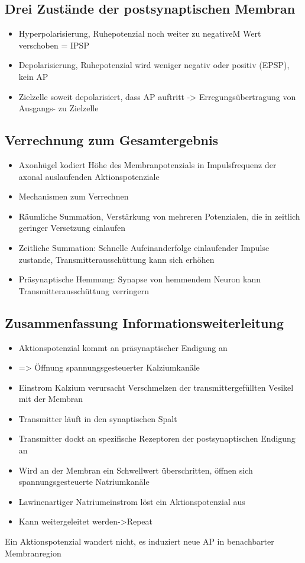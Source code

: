 \documentclass[a4paper,10pt,oneside]{article}
\begin{document}
\subsection{Drei Zustände der postsynaptischen Membran}
\begin{itemize}
	\item Hyperpolarisierung, Ruhepotenzial noch weiter zu negativeM Wert verschoben = IPSP
	\item Depolarisierung, Ruhepotenzial wird weniger negativ oder positiv (EPSP), kein AP
	\item Zielzelle soweit depolarisiert, dass AP auftritt -> Erregungsübertragung von Ausgangs- zu Zielzelle
\end{itemize}

\subsection{Verrechnung zum Gesamtergebnis}
\begin{itemize}
	\item Axonhügel kodiert Höhe des Membranpotenzials in Impulsfrequenz der axonal auslaufenden Aktionspotenziale
	\item Mechanismen zum Verrechnen
	\item Räumliche Summation, Verstärkung von mehreren Potenzialen, die in zeitlich geringer Versetzung einlaufen
	\item Zeitliche Summation: Schnelle Aufeinanderfolge einlaufender Impulse zustande, Transmitterausschüttung kann sich erhöhen
	\item Präsynaptische Hemmung: Synapse von hemmendem Neuron kann Transmitterausschüttung verringern
\end{itemize}

\subsection{Zusammenfassung Informationsweiterleitung}
\begin{itemize}
	\item Aktionspotenzial kommt an präsynaptischer Endigung an
	\item => Öffnung spannungsgesteuerter Kalziumkanäle
	\item Einstrom Kalzium verursacht Verschmelzen der transmittergefüllten Vesikel mit der Membran
	\item Transmitter läuft in den synaptischen Spalt
	\item Transmitter dockt an spezifische Rezeptoren der postsynaptischen Endigung an
	\item Wird an der Membran ein Schwellwert überschritten, öffnen sich spannungsgesteuerte Natriumkanäle
	\item Lawinenartiger Natriumeinstrom löst ein Aktionspotenzial aus
	\item Kann weitergeleitet werden->Repeat
\end{itemize}
Ein Aktionspotenzial wandert nicht, es induziert neue AP in benachbarter Membranregion
\end{document}
